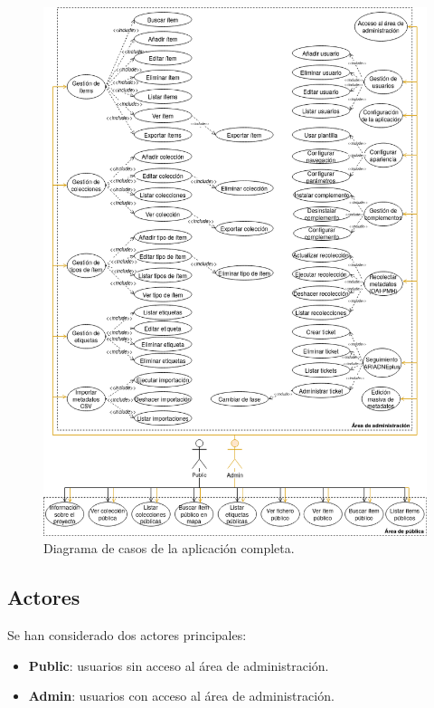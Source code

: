 \documentclass[
]{article}
\providecommand{\tightlist}{%
  \setlength{\itemsep}{0pt}\setlength{\parskip}{0pt}}
\begin{document}
\begin{figure}
\hypertarget{use-cases-uml}{%
\centering
\includegraphics{../_static/images/use-cases-uml.png}
\caption{Diagrama de casos de la aplicación
completa.}\label{use-cases-uml}
}
\end{figure}

\hypertarget{actores}{%
\subsection{Actores}\label{actores}}

Se han considerado dos actores principales:

\begin{itemize}
\tightlist
\item
  \textbf{Public}: usuarios sin acceso al área de administración.
\item
  \textbf{Admin}: usuarios con acceso al área de administración.
\end{itemize}
\end{document}
